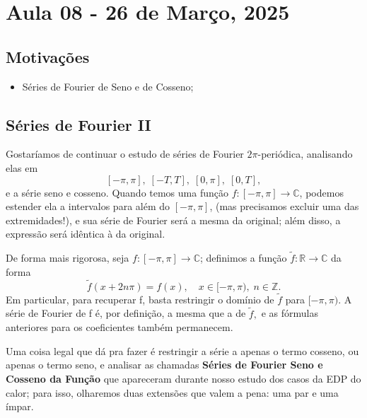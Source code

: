 \documentclass[../pde_notes.tex]{subfiles}
\begin{document}
\section{Aula 08 - 26 de Março, 2025}
\subsection{Motivações}
\begin{itemize}
	\item Séries de Fourier de Seno e de Cosseno;
\end{itemize}
\subsection{Séries de Fourier II}
Gostaríamos de continuar o estudo de séries de Fourier \(2\pi \)-periódica, analisando elas em
\[
	[-\pi ,\pi ],\; [-T, T],\;[0,\pi ],\;[0,T],
\]
e a série seno e cosseno. Quando temos uma função \(f:[-\pi ,\pi ]\rightarrow \mathbb{C}\), podemos estender ela a intervalos para além do \([-\pi ,\pi ]\), (mas precisamos excluir uma das extremidades!), e sua série de Fourier será a mesma da original; além disso, a expressão será idêntica à da original.

De forma mais rigorosa, seja \(f:[-\pi ,\pi ]\rightarrow \mathbb{C}\); definimos a função \(\tilde{f}:\mathbb{R}\rightarrow \mathbb{C}\) da forma
\[
	\tilde{f}(x+2n\pi )=f(x),\quad x\in[-\pi ,\pi ),\; n\in \mathbb{Z}.
\]
Em particular, para recuperar f, basta restringir o domínio de \(\tilde{f}\) para \([-\pi , \pi )\). A série de Fourier de f é, por definição, a mesma que a de \(\tilde{f},\) e as fórmulas anteriores para os coeficientes também permanecem.

Uma coisa legal que dá pra fazer é restringir a série a apenas o termo cosseno, ou apenas o termo seno, e analisar as chamadas \textbf{Séries de Fourier Seno e Cosseno da Função} que apareceram durante nosso estudo dos casos da EDP do calor; para isso, olharemos duas extensões que valem a pena: uma par e uma ímpar.
\end{document}

